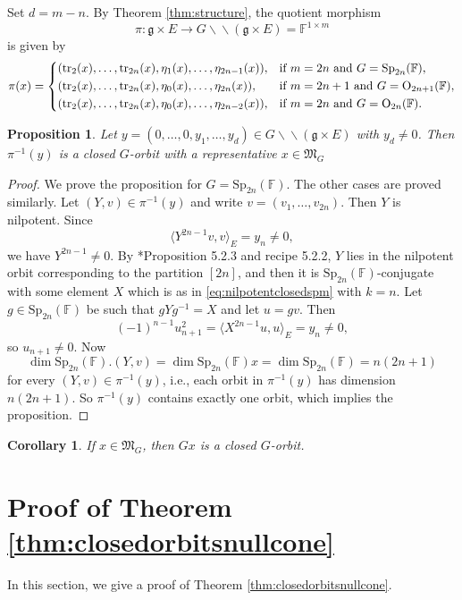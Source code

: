 \documentclass[12pt]{amsart}
\newtheorem{cor}[lm]{Corollary}
\newtheorem{prop}[lm]{Proposition}
\theoremstyle{definition}
\theoremstyle{remark}\newtheorem{rmk}[lm]{Remark}
\newcommand{\RO}{{\mathrm {O}}}
\newcommand{\Sp}{{\mathrm{Sp}}}
\newcommand{\tr}{{\mathrm{tr}}}
\newcommand{\g}{\mathfrak g}
\newcommand{\fM}{\mathfrak M}
\newcommand{\C}{\mathbb{F}}
\newcommand{\bac}{\backslash\!\!\backslash}
\begin{document}
	Set $d=m-n$. By Theorem \ref{thm:structure}, the quotient morphism $$\pi:\g\times E\to G\bac(\g\times E)=\C^{1\times m}$$ is given by
	\begin{equation*}
		\pi(x)=\begin{cases*}
			(\tr_2(x),\dots,\tr_{2n}(x),\eta_1(x),\dots,\eta_{2n-1}(x)),&if $m=2n$ and $G=\Sp_{2n}(\C)$,\\
			(\tr_2(x),\dots,\tr_{2n}(x),\eta_0(x),\dots,\eta_{2n}(x)),&if $m=2n+1$ and $G=\RO_{2n+1}(\C)$,\\
			(\tr_2(x),\dots,\tr_{2n}(x),\eta_0(x),\dots,\eta_{2n-2}(x)),&if $m=2n$ and $G=\RO_{2n}(\C)$.
		\end{cases*}
	\end{equation*}
	
	\begin{prop}
		\label{prop:closedmaximal}
		Let $y=(0,\dots,0,y_1,\dots,y_d)\in G\bac(\g\times E)$ with $y_d\neq 0$. Then $\pi^{-1}(y)$ is a closed $G$-orbit with a representative $x\in\fM_G$
	\end{prop}
	\begin{proof}
		We prove the proposition for $G=\Sp_{2n}(\C)$. The other cases are proved similarly. Let $(Y,v)\in\pi^{-1}(y)$ and write $v=(v_1,\dots,v_{2n})$. Then $Y$ is nilpotent. Since
		\begin{equation*}
			\langle Y^{2n-1}v,v\rangle_E=y_n\neq 0,
		\end{equation*}
		we have $Y^{2n-1}\neq 0$. By \cite{CM}*{Proposition 5.2.3 and recipe 5.2.2}, $Y$ lies in the nilpotent orbit corresponding to the partition $[2n]$, and then it is $\Sp_{2n}(\C)$-conjugate with some element $X$ which is as in \eqref{eq:nilpotentclosedspm} with $k=n$. Let $g\in\Sp_{2n}(\C)$ be such that $gYg^{-1}=X$ and let $u=gv$. Then
		\begin{equation*}
			(-1)^{n-1}u_{n+1}^2=\langle X^{2n-1}u,u\rangle_E=y_n\neq 0,
		\end{equation*}
		so $u_{n+1}\neq 0$. Now $$\dim\Sp_{2n}(\C).(Y,v)=\dim\Sp_{2n}(\C)x=\dim\Sp_{2n}(\C)=n(2n+1)$$ for every $(Y,v)\in\pi^{-1}(y)$, i.e., each orbit in $\pi^{-1}(y)$ has dimension $n(2n+1)$. So $\pi^{-1}(y)$ contains exactly one orbit, which implies the proposition.
	\end{proof}

	\begin{cor}
		\label{cor:closedmaximal}
		If $x\in\fM_G$, then $Gx$ is a closed $G$-orbit.
	\end{cor}
    
	\section{Proof of Theorem \ref{thm:closedorbitsnullcone}}\label{sec:4}
    In this section, we give a proof of Theorem \ref{thm:closedorbitsnullcone}.
    
\end{document}
